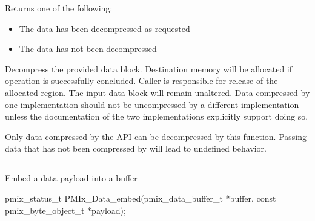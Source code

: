 \begin{arglist}
\end{arglist}

Returns one of the following:
\begin{itemize}
\item {} The data has been decompressed as requested
\item {} The data has not been decompressed
\end{itemize}

\descr

Decompress the provided data block. Destination memory
will be allocated if operation is successfully concluded. Caller
is responsible for release of the allocated region. The input
data block will remain unaltered.
Data compressed by one implementation should not be uncompressed by a different implementation unless 
the documentation of the two implementations explicitly support doing so.

Only data compressed by the  \ac{API}
can be decompressed by this function. Passing data that has not
been compressed by  will lead to
undefined behavior.


\subsection{}

\summary

Embed a data payload into a buffer

\format

\cspecificstart
\begin{codepar}
pmix_status_t
PMIx_Data_embed(pmix_data_buffer_t *buffer,
                const pmix_byte_object_t *payload);
\end{codepar}
\cspecificend

\begin{arglist}
\end{arglist}

